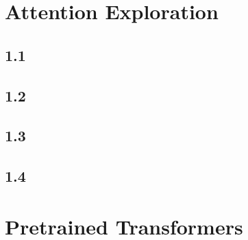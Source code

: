 \documentclass{article}
\begin{document}
\section{Attention Exploration}
\subsection*{1.1}


\subsection*{1.2}


\subsection*{1.3}


\subsection*{1.4}

% 

% 

% 

% 

\section{Pretrained Transformers}
\setcounter{subsection}{3}
\subsection{}

\setcounter{subsection}{5}
\subsection{}

\end{document}
